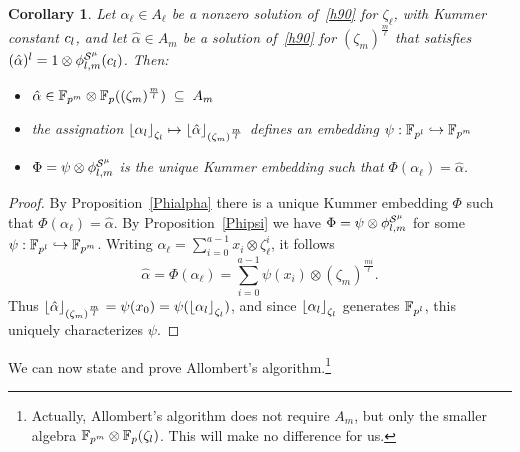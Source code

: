 \documentclass{sig-alternate}
\newtheorem{corollary}[theorem]{Corollary}
\begin{document}
\begin{corollary}
\label{alphapsi}
Let $\alpha_\ell\in A_\ell$ be a nonzero solution of~\eqref{h90} for $\zeta_\ell$,
with Kummer constant $c_l$, and
let $\hat{\alpha}\in A_m$ be a solution of~\eqref{h90} for $(\zeta_m)^{\frac{m}{\ell}}$
that satisfies $(\hat{\alpha})^l=1\otimes{\phi^{\mathcal{S}^\mu}_{{l},{m}}}(c_l)$.
Then:
\begin{itemize}
\item $\hat{\alpha}\in\mathbb{F}_{p^m}\otimes\mathbb{F}_{p}((\zeta_m)^{\frac{m}{l}})\;\subseteq\;A_m$
\item the assignation $\left\lfloor \alpha_{l} \right\rfloor_{\zeta_l}\mapsto\left\lfloor \hat{\alpha} \right\rfloor_{(\zeta_m)^{\frac{m}{l}}}$
defines an embedding $\psi:\mathbb{F}_{p^l}\hookrightarrow\mathbb{F}_{p^m}$
\item $\Phi=\psi\otimes{\phi^{\mathcal{S}^\mu}_{{l},{m}}}$ is the unique Kummer embedding such that $\Phi(\alpha_\ell)=\hat{\alpha}$.
\end{itemize}
\end{corollary}
\begin{proof}
By Proposition~\ref{Phialpha} there is a unique Kummer embedding $\Phi$ such that $\Phi(\alpha_\ell)=\hat{\alpha}$.
By Proposition~\ref{Phipsi} we have $\Phi=\psi\otimes{\phi^{\mathcal{S}^\mu}_{{l},{m}}}$ for some $\psi:\mathbb{F}_{p^l}\hookrightarrow\mathbb{F}_{p^m}$.
Writing $\alpha_\ell=\sum_{i=0}^{a-1}x_i\otimes\zeta_{\ell}^i$,
it follows \[ \hat{\alpha}=\Phi(\alpha_\ell)=\sum_{i=0}^{a-1}\psi(x_i)\otimes(\zeta_m)^{\frac{mi}{\ell}}. \]
Thus $\left\lfloor \hat{\alpha} \right\rfloor_{(\zeta_m)^{\frac{m}{l}}}=\psi(x_0)=\psi(\left\lfloor \alpha_{l} \right\rfloor_{\zeta_l})$,
and since $\left\lfloor \alpha_{l} \right\rfloor_{\zeta_l}$ generates $\mathbb{F}_{p^l}$, this uniquely characterizes $\psi$.
\end{proof}

We can now state and prove Allombert's algorithm.\footnote{Actually,
  Allombert's algorithm does not require $A_m$,
  but only the smaller algebra $\mathbb{F}_{p^m}\otimes\mathbb{F}_p(\zeta_l)$.
  This will make no difference for us.}
\end{document}
